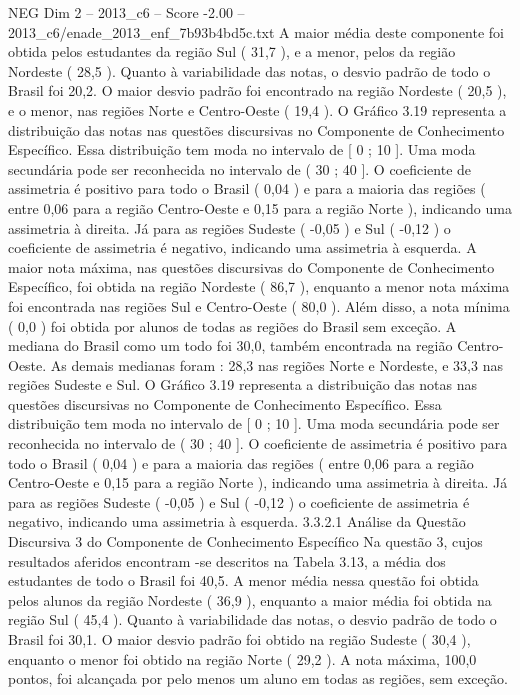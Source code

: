 \begin{textsample}{NEG Dim 2 – 2013\_c6 – Score -2.00 – 2013\_c6/enade\_2013\_enf\_7b93b4bd5c.txt}
A maior média deste componente foi obtida pelos estudantes da região Sul ( 31,7 ), e a menor, pelos da região Nordeste ( 28,5 ).
Quanto à variabilidade das notas, o desvio padrão de todo o Brasil foi 20,2.
O maior desvio padrão foi encontrado na região Nordeste ( 20,5 ), e o menor, nas regiões Norte e Centro-Oeste ( 19,4 ).
O Gráfico 3.19 representa a distribuição das notas nas questões discursivas no Componente de Conhecimento Específico.
Essa distribuição tem moda no intervalo de [ 0 ; 10 ].
Uma moda secundária pode ser reconhecida no intervalo de ( 30 ; 40 ].
O coeficiente de assimetria é positivo para todo o Brasil ( 0,04 ) e para a maioria das regiões ( entre 0,06 para a região Centro-Oeste e 0,15 para a região Norte ), indicando uma assimetria à direita.
Já para as regiões Sudeste ( -0,05 ) e Sul ( -0,12 ) o coeficiente de assimetria é negativo, indicando uma assimetria à esquerda.
A maior nota máxima, nas questões discursivas do Componente de Conhecimento Específico, foi obtida na região Nordeste ( 86,7 ), enquanto a menor nota máxima foi encontrada nas regiões Sul e Centro-Oeste ( 80,0 ).
Além disso, a nota mínima ( 0,0 ) foi obtida por alunos de todas as regiões do Brasil sem exceção.
A mediana do Brasil como um todo foi 30,0, também encontrada na região Centro-Oeste.
As demais medianas foram : 28,3 nas regiões Norte e Nordeste, e 33,3 nas regiões Sudeste e Sul.
O Gráfico 3.19 representa a distribuição das notas nas questões discursivas no Componente de Conhecimento Específico.
Essa distribuição tem moda no intervalo de [ 0 ; 10 ].
Uma moda secundária pode ser reconhecida no intervalo de ( 30 ; 40 ].
O coeficiente de assimetria é positivo para todo o Brasil ( 0,04 ) e para a maioria das regiões ( entre 0,06 para a região Centro-Oeste e 0,15 para a região Norte ), indicando uma assimetria à direita.
Já para as regiões Sudeste ( -0,05 ) e Sul ( -0,12 ) o coeficiente de assimetria é negativo, indicando uma assimetria à esquerda. 3.3.2.1 Análise da Questão Discursiva 3 do Componente de Conhecimento Específico Na questão 3, cujos resultados aferidos encontram -se descritos na Tabela 3.13, a média dos estudantes de todo o Brasil foi 40,5.
A menor média nessa questão foi obtida pelos alunos da região Nordeste ( 36,9 ), enquanto a maior média foi obtida na região Sul ( 45,4 ).
Quanto à variabilidade das notas, o desvio padrão de todo o Brasil foi 30,1.
O maior desvio padrão foi obtido na região Sudeste ( 30,4 ), enquanto o menor foi obtido na região Norte ( 29,2 ).
A nota máxima, 100,0 pontos, foi alcançada por pelo menos um aluno em todas as regiões, sem exceção.

\end{textsample}
